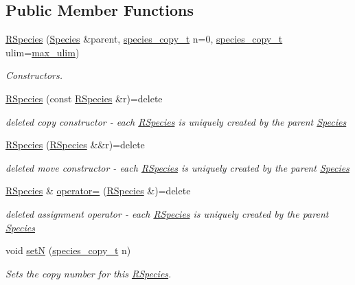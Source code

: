 \subsection*{Public Member Functions}
\begin{DoxyCompactItemize}
\item 
\hyperlink{classRSpecies_a42066424867af0b109d0833f8826072b}{R\+Species} (\hyperlink{classSpecies}{Species} \&parent, \hyperlink{common_8h_a3503f321fd36304ee274141275cca586}{species\+\_\+copy\+\_\+t} n=0, \hyperlink{common_8h_a3503f321fd36304ee274141275cca586}{species\+\_\+copy\+\_\+t} ulim=\hyperlink{common_8h_adaf831a0b61083f29adf8fc6e8edab35}{max\+\_\+ulim})
\begin{DoxyCompactList}\small\item\em Constructors. \end{DoxyCompactList}\item 
\hyperlink{classRSpecies_aff60041af8192798c9c67c8c5b9a69a4}{R\+Species} (const \hyperlink{classRSpecies}{R\+Species} \&r)=delete
\begin{DoxyCompactList}\small\item\em deleted copy constructor -\/ each \hyperlink{classRSpecies}{R\+Species} is uniquely created by the parent \hyperlink{classSpecies}{Species} \end{DoxyCompactList}\item 
\hyperlink{classRSpecies_abadb78fc4c8b8e2ddfeda6285b0fda40}{R\+Species} (\hyperlink{classRSpecies}{R\+Species} \&\&r)=delete
\begin{DoxyCompactList}\small\item\em deleted move constructor -\/ each \hyperlink{classRSpecies}{R\+Species} is uniquely created by the parent \hyperlink{classSpecies}{Species} \end{DoxyCompactList}\item 
\hyperlink{classRSpecies}{R\+Species} \& \hyperlink{classRSpecies_a634f7c45052258c7c971fe6b4b576d0d}{operator=} (\hyperlink{classRSpecies}{R\+Species} \&)=delete
\begin{DoxyCompactList}\small\item\em deleted assignment operator -\/ each \hyperlink{classRSpecies}{R\+Species} is uniquely created by the parent \hyperlink{classSpecies}{Species} \end{DoxyCompactList}\item 
void \hyperlink{classRSpecies_af15e0af66ae1171253b9205f4cd8dfd8}{set\+N} (\hyperlink{common_8h_a3503f321fd36304ee274141275cca586}{species\+\_\+copy\+\_\+t} n)
\begin{DoxyCompactList}\small\item\em Sets the copy number for this \hyperlink{classRSpecies}{R\+Species}. \end{DoxyCompactList}\item 

\end{DoxyCompactItemize}
